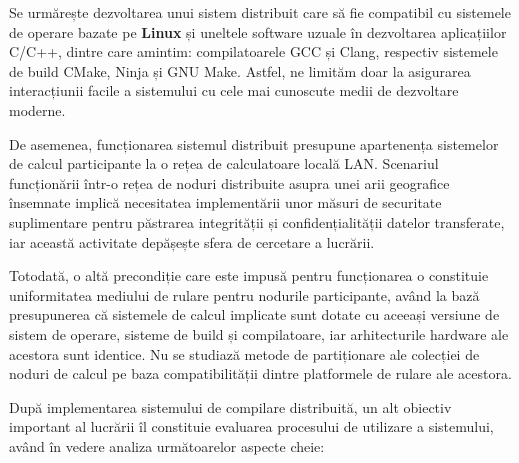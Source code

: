 Se urmărește dezvoltarea unui sistem distribuit care să fie compatibil cu sistemele de operare
bazate pe \textbf{Linux} și uneltele software uzuale în dezvoltarea aplicațiilor C/C++, dintre
care amintim: compilatoarele GCC și Clang, respectiv sistemele de build CMake, Ninja și GNU Make.
Astfel, ne limităm doar la asigurarea interacțiunii facile a sistemului cu  cele mai cunoscute
medii de dezvoltare moderne.

De asemenea, funcționarea sistemul distribuit presupune apartenența sistemelor de calcul
participante la o rețea de calculatoare locală LAN. Scenariul funcționării într-o rețea
de noduri distribuite asupra unei arii geografice însemnate implică necesitatea implementării
unor măsuri de securitate suplimentare pentru păstrarea integrității și confidențialității
datelor transferate, iar această activitate depășește sfera de cercetare a lucrării.

Totodată, o altă precondiție care este impusă pentru funcționarea o constituie uniformitatea
mediului de rulare pentru nodurile participante, având la bază presupunerea că sistemele de calcul
implicate sunt dotate cu aceeași versiune de sistem de operare, sisteme de build și compilatoare, 
iar arhitecturile hardware ale acestora sunt identice. Nu se studiază metode de partiționare 
ale colecției de noduri de calcul pe baza compatibilității dintre platformele de rulare ale acestora.

După implementarea sistemului de compilare distribuită, un alt obiectiv important al lucrării îl constituie
evaluarea procesului de utilizare a sistemului, având în vedere analiza următoarelor aspecte cheie:

